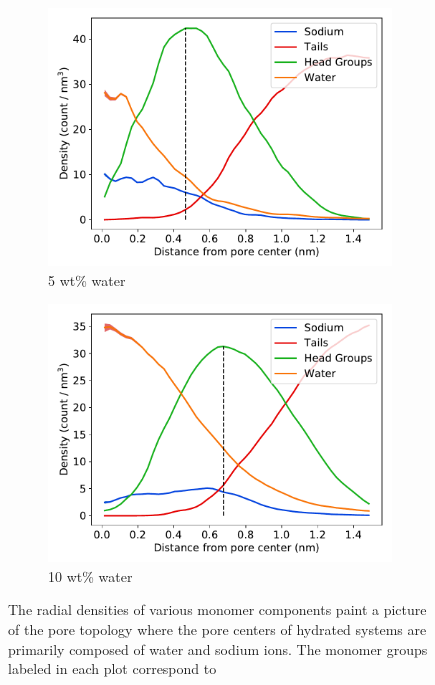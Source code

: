 \documentclass[journal=jpcbfk,manuscript=article]{achemso}
\begin{document}
\begin{figure}[!htb]
\begin{subfigure}{0.45\textwidth}
  \includegraphics[width=\textwidth]{component_density_5wt.pdf}
  \caption{5 wt\% water}\label{fig:component_density_5wt}
  \end{subfigure}
  \begin{subfigure}{0.45\textwidth}
  \includegraphics[width=\textwidth]{component_density_10wt.pdf}
  \caption{10 wt\% water}\label{fig:component_density_10wt}
  \end{subfigure}
  \caption{The radial densities of various monomer components paint a 
  picture of the pore topology where the pore centers of hydrated systems are primarily composed
  of water and sodium ions. The monomer groups labeled in each plot correspond to 
}
\end{figure}
\end{document}
